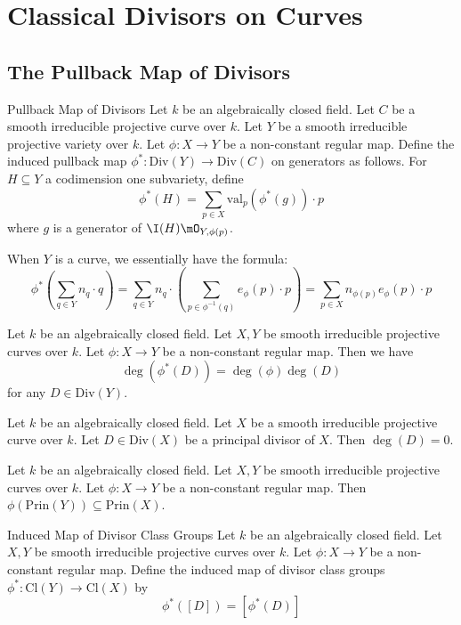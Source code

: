 \documentclass[a4paper]{article}
\begin{document}
\pagebreak
\section{Classical Divisors on Curves}
\subsection{The Pullback Map of Divisors}
\begin{defn}{Pullback Map of Divisors}{} Let $k$ be an algebraically closed field. Let $C$ be a smooth irreducible projective curve over $k$. Let $Y$ be a smooth irreducible projective variety over $k$. Let $\phi:X\to Y$ be a non-constant regular map. Define the induced pullback map $\phi^\ast:\text{Div}(Y)\to\text{Div}(C)$ on generators as follows. For $H\subseteq Y$ a codimension one subvariety, define $$\phi^\ast(H)=\sum_{p\in X}\text{val}_p(\phi^\ast(g))\cdot p$$ where $g$ is a generator of $\I(H)\mO_{Y,\phi(p)}$. 
\end{defn}

When $Y$ is a curve, we essentially have the formula: $$\phi^\ast\left(\sum_{q\in Y} n_q\cdot q\right)=\sum_{q\in Y}n_q\cdot\left(\sum_{p\in\phi^{-1}(q)}e_\phi(p)\cdot p\right)=\sum_{p\in X}n_{\phi(p)}e_\phi(p)\cdot p$$

\begin{prp}{}{} Let $k$ be an algebraically closed field. Let $X,Y$ be smooth irreducible projective curves over $k$. Let $\phi:X\to Y$ be a non-constant regular map. Then we have $$\deg(\phi^\ast(D))=\deg(\phi)\deg(D)$$ for any $D\in\text{Div}(Y)$. 
\end{prp}

\begin{prp}{}{} Let $k$ be an algebraically closed field. Let $X$ be a smooth irreducible projective curve over $k$. Let $D\in\text{Div}(X)$ be a principal divisor of $X$. Then $\deg(D)=0$. 
\end{prp}

\begin{prp}{}{} Let $k$ be an algebraically closed field. Let $X,Y$ be smooth irreducible projective curves over $k$. Let $\phi:X\to Y$ be a non-constant regular map. Then $\phi(\text{Prin}(Y))\subseteq\text{Prin}(X)$. 
\end{prp}

\begin{defn}{Induced Map of Divisor Class Groups}{} Let $k$ be an algebraically closed field. Let $X,Y$ be smooth irreducible projective curves over $k$. Let $\phi:X\to Y$ be a non-constant regular map. Define the induced map of divisor class groups $\phi^\ast:\text{Cl}(Y)\to\text{Cl}(X)$ by $$\phi^\ast([D])=[\phi^\ast(D)]$$
\end{defn}
\end{document}
